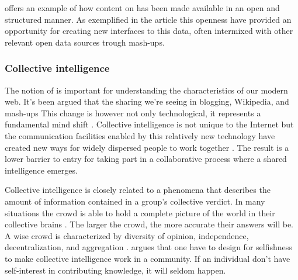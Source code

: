 \citet{auer07} offers an example of how content on %
has been made available in an open and structured manner. As exemplified
in the article this openness have provided an opportunity for creating new
interfaces to this data, often intermixed with other relevant open
data sources trough mash-ups.

\subsubsection{Collective intelligence}
The notion of  is important for understanding
the characteristics of our modern web. It's been argued that the sharing we're
seeing in blogging, Wikipedia, and mash-ups
This change is however not only technological, it represents a fundamental
mind shift \citep[]{kolbitsch06}.
Collective intelligence is not unique
to the Internet but the communication facilities enabled by this relatively
new technology have created new ways for widely dispersed people to work
together \citep{mitcenter08}. The result is a lower barrier to entry for
taking part in a collaborative process where a shared intelligence emerges.

Collective intelligence is closely related to
\dash{}a phenomena that describes the amount of
information contained in a group's collective verdict.
In many situations the crowd is able to hold a complete picture of the world
in their collective brains \citep[]{surowiecki04}. The larger the
crowd, the more accurate their answers will be.%
A wise crowd is characterized by diversity of opinion, independence,
decentralization, and aggregation \citep[]{surowiecki04}.
\citet{powazek08} argues that one have to design for selfishness to make
collective intelligence work in a community. If an individual don't have
self-interest in contributing knowledge, it will seldom happen.

